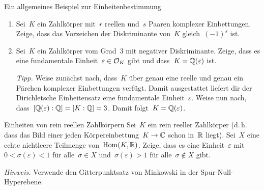 \documentclass{uebblatt}
\begin{document}
\begin{aufgabe}{Ein allgemeines Beispiel zur Einheitenbestimmung}
\begin{enumerate}
\item Sei~$K$ ein Zahlkörper mit~$r$ reellen und~$s$ Paaren komplexer
Einbettungen. Zeige, dass das Vorzeichen der Diskriminante von~$K$
gleich~$(-1)^s$ ist.
\item Sei~$K$ ein Zahlkörper vom Grad~3 mit negativer Diskriminante. Zeige,
dass es eine fundamentale Einheit~$\varepsilon \in \mathcal{O}_K$ gibt und dass~$K =
\mathbb{Q}(\varepsilon)$ ist.

{\tiny\emph{Tipp.} Weise zunächst nach, dass~$K$ über genau eine reelle und
genau ein Pärchen komplexer Einbettungen verfügt. Damit ausgestattet liefert
dir der Dirichletsche Einheitensatz eine fundamentale Einheit~$\varepsilon$.
Weise nun nach, dass~$[\mathbb{Q}(\varepsilon) : \mathbb{Q}] = [K : \mathbb{Q}] = 3$. Damit folgt~$K
= \mathbb{Q}(\varepsilon)$.\par}
\end{enumerate}
\end{aufgabe}

\begin{aufgabe}{Einheiten von rein reellen Zahlkörpern}
Sei~$K$ ein rein reeller Zahlkörper (d.\,h. dass das Bild einer jeden
Körpereinbettung~$K \to \mathbb{C}$ schon in~$\mathbb{R}$ liegt). Sei~$X$ eine echte
nichtleere Teilmenge von~$\mathrm{Hom}(K, \mathbb{R})$. Zeige, dass es eine
Einheit~$\varepsilon$ mit~$0 < \sigma(\varepsilon) < 1$ für alle~$\sigma \in X$
und~$\sigma(\varepsilon) > 1$ für alle~$\sigma \not\in X$ gibt.

{\tiny\emph{Hinweis.} Verwende den Gitterpunktsatz von Minkowski in der
Spur-Null-Hyperebene.\par}
\end{aufgabe}
\end{document}

